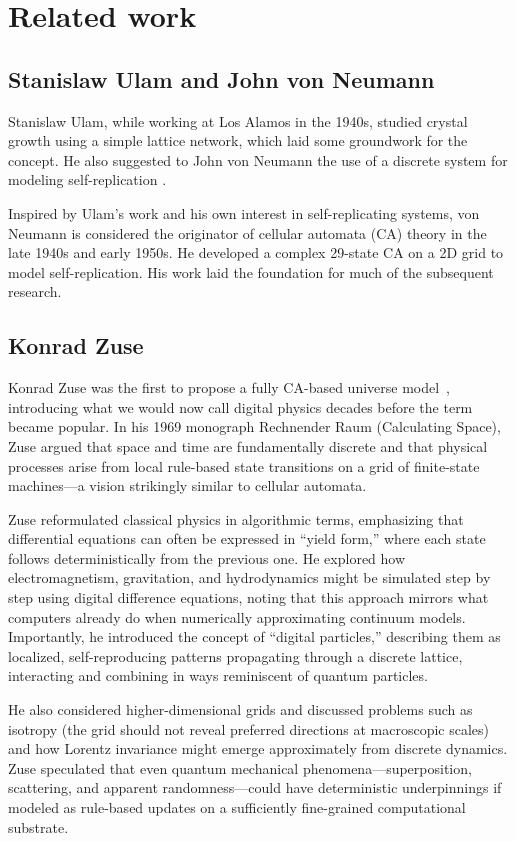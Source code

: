 \documentclass[12pt]{article}
\begin{document}
\section{Related work} \label{sec:related-work}

\subsection*{Stanislaw Ulam and John von Neumann}
Stanislaw Ulam, while working at Los Alamos in the 1940s, studied crystal growth using a simple lattice network, which laid some groundwork for the concept. He also suggested to John von Neumann the use of a discrete system for modeling self-replication \cite{ulam1952,vonNeumann1966}.

Inspired by Ulam's work and his own interest in self-replicating systems, von Neumann is considered the originator of cellular automata (CA) theory in the late 1940s and early 1950s. He developed a complex 29-state CA on a 2D grid to model self-replication. His work laid the foundation for much of the subsequent research.

\subsection*{Konrad Zuse}
Konrad Zuse was the first to propose a fully CA-based universe model~\cite{zuse}, introducing what we would now call digital physics decades before the term became popular. In his 1969 monograph Rechnender Raum (Calculating Space), Zuse argued that space and time are fundamentally discrete and that physical processes arise from local rule-based state transitions on a grid of finite-state machines—a vision strikingly similar to cellular automata.

Zuse reformulated classical physics in algorithmic terms, emphasizing that differential equations can often be expressed in “yield form,” where each state follows deterministically from the previous one. He explored how electromagnetism, gravitation, and hydrodynamics might be simulated step by step using digital difference equations, noting that this approach mirrors what computers already do when numerically approximating continuum models. Importantly, he introduced the concept of “digital particles,” describing them as localized, self-reproducing patterns propagating through a discrete lattice, interacting and combining in ways reminiscent of quantum particles.

He also considered higher-dimensional grids and discussed problems such as isotropy (the grid should not reveal preferred directions at macroscopic scales) and how Lorentz invariance might emerge approximately from discrete dynamics. Zuse speculated that even quantum mechanical phenomena—superposition, scattering, and apparent randomness—could have deterministic underpinnings if modeled as rule-based updates on a sufficiently fine-grained computational substrate.
\end{document}
